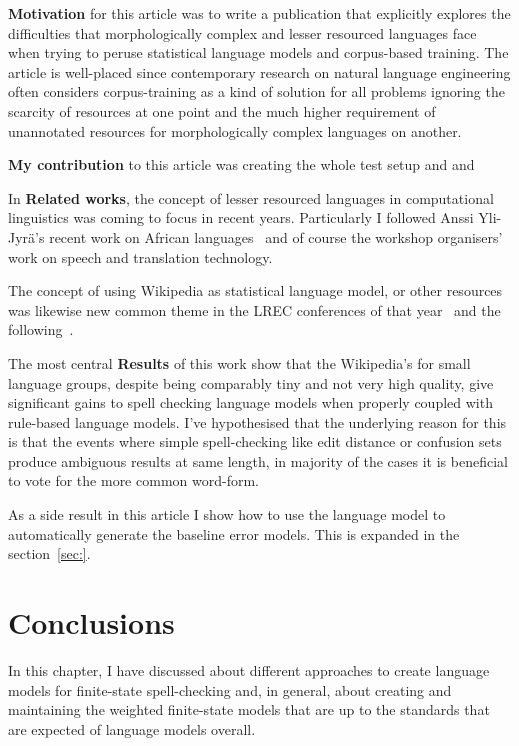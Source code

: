 \documentclass[officiallayout,draft]{unihelcompling}
\begin{document}
\textbf{Motivation} for this article was to write a publication that
explicitly explores the difficulties that morphologically complex and lesser
resourced languages face when trying to peruse statistical language models and
corpus-based training. The article is well-placed since contemporary research
on natural language engineering often considers corpus-training as a kind of
solution for all problems ignoring the scarcity of resources at one point and
the much higher requirement of unannotated resources for morphologically
complex languages on another.

\textbf{My contribution} to this article was creating the whole test setup and
and 

In \textbf{Related works}, the concept of lesser resourced languages in
computational linguistics was coming to focus in recent years. Particularly
I followed Anssi Yli-Jyrä's recent work on African languages~\cite{} and
of course the workshop organisers' work on speech and translation technology.

The concept of using Wikipedia as statistical language model, or other
resources was likewise new common theme in the LREC conferences of that 
year~\cite{}
and the following~\cite{}. 

The most central \textbf{Results} of this work show that the Wikipedia's for
small language groups, despite being comparably tiny and not very high quality,
give significant gains to spell checking language models when properly
coupled with rule-based language models. I've hypothesised that the underlying
reason for this is that the events where simple spell-checking like edit
distance or confusion sets produce ambiguous results at same length, in
majority of the cases it is beneficial to vote for the more common word-form.

As a side result in this article I show how to use the language model to
automatically generate the baseline error models. This is expanded in
the section~\ref{sec:}.


\section{Conclusions}

In this chapter, I have discussed about different
approaches to create language models for finite-state spell-checking and, in
general, about creating and maintaining the weighted finite-state models that
are up to the standards that are expected of language models overall. 
\end{document}
